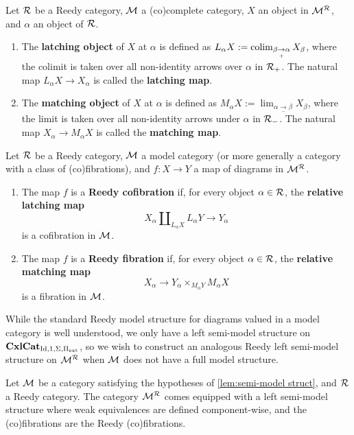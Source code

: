 \documentclass{amsart}
\begin{document}
\begin{defn}
    Let $\mathcal{R}$ be a Reedy category, $\mathcal{M}$ a (co)complete category, $X$ an object in $\mathcal{M}^{\mathcal{R}}$, and $\alpha$ an object of $\mathcal{R}$.
    \begin{enumerate}
        \item The \textbf{latching object} of $X$ at $\alpha$ is defined as $L_\alpha X:=\operatorname*{colim}_{\beta\underset{+}{\to}\alpha}X_\beta$, where the colimit is taken over all non-identity arrows over $\alpha$ in $\mathcal{R}_+$. The natural map $L_\alpha X\to X_\alpha$ is called the \textbf{latching map}.
        \item The \textbf{matching object} of $X$ at $\alpha$ is defined as $M_\alpha X:=\lim_{\alpha\underset{-}{\to}\beta}X_\beta$, where the limit is taken over all non-identity arrows under $\alpha$ in $\mathcal{R}_-$. The natural map $X_\alpha\to M_\alpha X$ is called the \textbf{matching map}.
    \end{enumerate}
\end{defn}
\begin{defn}
    Let $\mathcal{R}$ be a Reedy category, $\mathcal{M}$ a model category (or more generally a category with a class of (co)fibrations), and $f\colon X\to Y$ a map of diagrams in $\mathcal{M}^{\mathcal{R}}$.
    \begin{enumerate}
        \item The map $f$ is a \textbf{Reedy cofibration} if, for every object $\alpha\in\mathcal{R}$, the \textbf{relative latching map}
        \[X_\alpha\amalg_{L_\alpha X}L_\alpha Y\to Y_\alpha\]
        is a cofibration in $\mathcal{M}$.
        \item The map $f$ is a \textbf{Reedy fibration} if, for every object $\alpha\in\mathcal{R}$, the \textbf{relative matching map}
        \[X_\alpha\to Y_\alpha\times_{M_\alpha Y}M_\alpha X\]
        is a fibration in $\mathcal{M}$.
    \end{enumerate}
\end{defn}

While the standard Reedy model structure for diagrams valued in a model category is well understood, we only have a left semi-model structure on $\operatorname{\mathbf{CxlCat}}_{\operatorname{Id},1,\Sigma,\Pi_{\operatorname{ext}}}$, so we wish to construct an analogous Reedy left semi-model structure on $\mathcal{M}^{\mathcal{R}}$ when $\mathcal{M}$ does not have a full model structure.

\begin{thm}\label{thm:reedy left-semi model struct}
    Let $\mathcal{M}$ be a category satisfying the hypotheses of \ref{lem:semi-model struct}, and $\mathcal{R}$ a Reedy category. The category $\mathcal{M}^{\mathcal{R}}$ comes equipped with a left semi-model structure where weak equivalences are defined component-wise, and the (co)fibrations are the Reedy (co)fibrations.
\end{thm}
\end{document}
